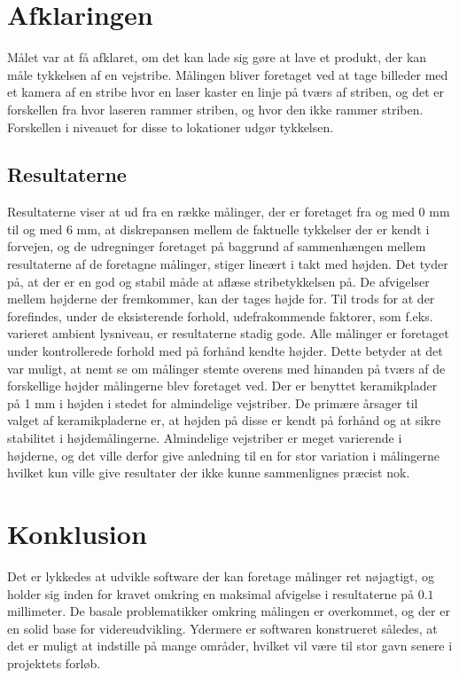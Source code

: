 \section{Afklaringen}
Målet var at få afklaret, om det kan lade sig gøre at lave et produkt, der kan måle tykkelsen af en vejstribe.
Målingen bliver foretaget ved at tage billeder med et kamera af en stribe hvor en laser kaster en linje på tværs af striben, og det er forskellen fra hvor laseren rammer striben, og hvor den ikke rammer striben. Forskellen i niveauet for disse to lokationer udgør tykkelsen.

\subsection{Resultaterne}
Resultaterne viser at ud fra en række målinger, der er foretaget fra og med 0 mm til og med 6 mm, at diskrepansen mellem de faktuelle tykkelser der er kendt i forvejen, og de udregninger foretaget på baggrund af sammenhængen mellem resultaterne af de foretagne målinger, stiger lineært i takt med højden.
Det tyder på, at der er en god og stabil måde at aflæse stribetykkelsen på. De afvigelser mellem højderne der fremkommer, kan der tages højde for. Til trods for at der forefindes, under de eksisterende forhold, udefrakommende faktorer, som f.eks. varieret ambient lysniveau, er resultaterne stadig gode. Alle målinger er foretaget under kontrollerede forhold med på forhånd kendte højder. Dette betyder at det var muligt, at nemt se om målinger stemte overens med hinanden på tværs af de forskellige højder målingerne blev foretaget ved.
Der er benyttet keramikplader på 1 mm i højden i stedet for almindelige vejstriber. De primære årsager til valget af keramikpladerne er, at højden på disse er kendt på forhånd og at sikre stabilitet i højdemålingerne. Almindelige vejstriber er meget varierende i højderne, og det ville derfor give anledning til en for stor variation i målingerne hvilket kun ville give resultater der ikke kunne sammenlignes præcist nok.

\section{Konklusion}
Det er lykkedes at udvikle software der kan foretage målinger ret nøjagtigt, og holder sig inden for kravet omkring en maksimal afvigelse i resultaterne på $0.1$ millimeter. De basale problematikker omkring målingen er overkommet, og der er en solid base for videreudvikling. Ydermere er softwaren konstrueret således, at det er muligt at indstille på mange områder, hvilket vil være til stor gavn senere i projektets forløb.

